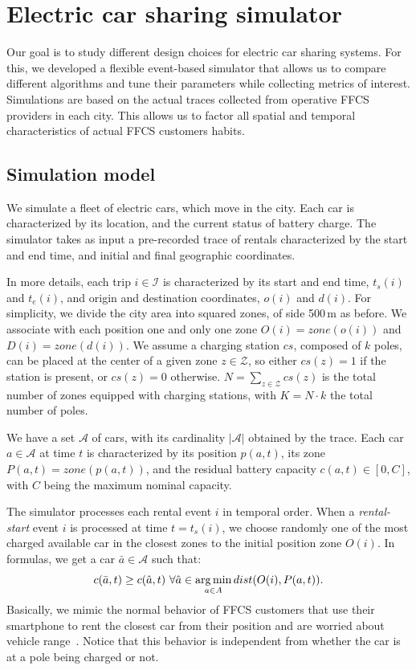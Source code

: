 \section{Electric car sharing simulator}
\label{sec:Modelling}

Our goal is to study different design choices for electric car sharing systems. For this, we developed a flexible event-based simulator that allows us to compare different algorithms and tune their parameters while collecting metrics of interest. Simulations are based on the actual traces collected from operative FFCS providers in each city. This allows us to factor all spatial and temporal characteristics of actual FFCS customers habits.

\subsection{Simulation model}

We simulate a fleet of electric cars, which move in the city. Each car is characterized by its location, and the current status of battery charge.  The simulator takes as input a pre-recorded trace of rentals characterized by the start and end time, and initial and final geographic coordinates.

In more details, each trip $i \in \mathcal{I}$  is characterized by its start and end time, $t_{s}(i)$ and $t_{e}(i)$, and origin and destination coordinates, $o(i)$ and $d(i)$. For simplicity, we divide the city area into squared zones, of side 500\,m as before. We associate with each position one and only one zone $O(i)=zone(o(i))$ and $D(i)=zone(d(i))$. We assume a charging station $cs$, composed of $k$ poles, can be placed at the center of a given zone $z\in \mathcal{Z}$, so either $cs(z)=1$ if the station is present, or $cs(z)=0$ otherwise. $N=\sum_{z\in \mathcal{Z}}cs(z)$ is the total number of zones equipped with charging stations, with 
$K=N\cdot k$ the total number of poles.


We have a set $\mathcal{A}$ of cars, with its cardinality $\left\vert{\mathcal{A}}\right\vert$ obtained by the trace. Each car $a\in \mathcal{A}$ at time $t$ is characterized by its position $p(a,t)$, its zone $P(a,t)=zone(p(a,t))$, and the residual battery capacity $c(a,t)\in[0,C]$, with $C$ being the maximum nominal capacity.

The simulator processes each rental event $i$ in temporal order. 
When a \emph{rental-start} event $i$ is processed at time $t=t_{s}(i)$, we choose randomly one of the most charged  available car in the closest zones to the initial position zone $O(i)$. In formulas, we get a car $\bar{a} \in \mathcal{A}$ such that:
\[
c(\bar{a},t) \geq c(\hat{a},t)\ \forall \hat{a} \in \argmin_{a \in A} {dist(O(i), P(a,t))}.
\]
Basically, we mimic the normal behavior of FFCS customers that use their smartphone to rent the closest car from their position and are worried about vehicle range~\cite{RangeAnxiety}. Notice that this behavior is
independent from whether the car is at a pole being charged or not.




